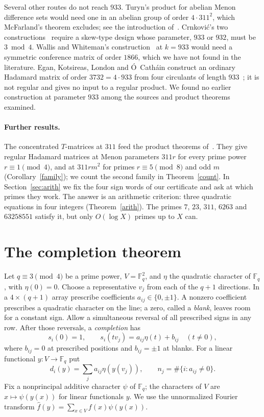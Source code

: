 \documentclass[11pt]{article}
\theoremstyle{remark}
\newcommand{\F}{\mathbb F}
\begin{document}
Several other routes do not reach $933$. Turyn's product for abelian Menon difference sets would need one in an abelian group of order $4\cdot311^2$, which McFarland's theorem excludes; see the introduction of~\cite{MX}. Crnkovi\'c's two constructions~\cite{Crn} require a skew-type design whose parameter, $933$ or $932$, must be $3\bmod4$. Wallis and Whiteman's construction~\cite[Corollary~17]{WW} at $k=933$ would need a symmetric conference matrix of order $1866$, which we have not found in the literature. Egan, Kotsireas, London and \'O~Cath\'ain construct an ordinary Hadamard matrix of order $3732=4\cdot933$ from four circulants of length $933$~\cite[\S4]{EKLO}; it is not regular and gives no input to a regular product. We found no earlier construction at parameter $933$ among the sources and product theorems examined.

\paragraph{Further results.}
The concentrated $T$-matrices at $311$ feed the product theorems of~\cite{XXS}. They give regular Hadamard matrices at Menon parameters $311r$ for every prime power $r\equiv1\pmod4$, and at $311rm^2$ for primes $r\equiv5\pmod8$ and odd $m$ (Corollary~\ref{family}); we count the second family in Theorem~\ref{count}. In Section~\ref{sec:arith} we fix the four sign words of our certificate and ask at which primes they work. The answer is an arithmetic criterion: three quadratic equations in four integers (Theorem~\ref{arith}). The primes $7$, $23$, $311$, $6263$ and $63258551$ satisfy it, but only $O(\log X)$ primes up to $X$ can.

\section{The completion theorem}\label{sec:completion}
Let $q\equiv3\pmod4$ be a prime power, $V=\F_q^2$, and $\eta$ the quadratic character of $\F_q$, with $\eta(0)=0$. Choose a representative $v_j$ from each of the $q+1$ directions. In a $4\times(q+1)$ array prescribe coefficients $a_{ij}\in\{0,\pm1\}$. A nonzero coefficient prescribes a quadratic character on the line; a zero, called a \emph{blank}, leaves room for a constant sign. Allow a simultaneous reversal of all prescribed signs in any row. After those reversals, a \emph{completion} has
\begin{equation}\label{line}
 s_i(0)=1,\qquad s_i(tv_j)=a_{ij}\eta(t)+b_{ij}\quad(t\ne0),
\end{equation}
where $b_{ij}=0$ at prescribed positions and $b_{ij}=\pm1$ at blanks. For a linear functional $y\colon V\to\F_q$ put
\[
 d_i(y)=\sum_j a_{ij}\eta(y(v_j)),\qquad n_j=\#\{i:a_{ij}\ne0\}.
\]
Fix a nonprincipal additive character $\psi$ of $\F_q$; the characters of $V$ are $x\mapsto\psi(y(x))$ for linear functionals $y$. We use the unnormalized Fourier transform $\widehat f(y)=\sum_{x\in V}f(x)\psi(y(x))$.
\end{document}
